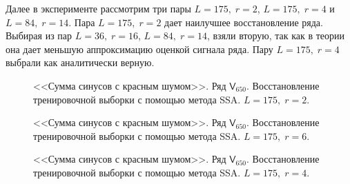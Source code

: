 \documentclass[specialist,
               substylefile = spbu.rtx,
               subf,href,colorlinks=true, 12p]{disser}
\begin{document}
Далее в эксперименте рассмотрим три пары $L = 175, \; r = 2$, $L = 175, \; r = 4$ и $L = 84, \; r = 14$. Пара $L = 175, \; r = 2$ дает наилучшее восстановление ряда. Выбирая из пар $L = 36, \; r = 16$, $L = 84, \; r = 14$, взяли вторую, так как в теории она дает меньшую аппроксимацию оценкой сигнала ряда. Пару $L = 175, \; r = 4$ выбрали как аналитически верную.

\begin{figure}[H]
	\captionsetup{justification=centering}
	\caption{<<Сумма синусов с красным шумом>>. Ряд $\mathsf{V}_{650}$. Восстановление тренировочной выборки с помощью метода SSA. $L = 175, \; r = 2$.}
	\label{ser_ssa_LH_r2}
\end{figure}

\begin{figure}[H]
	\captionsetup{justification=centering}
	\caption{<<Сумма синусов с красным шумом>>. Ряд $\mathsf{V}_{650}$. Восстановление тренировочной выборки с помощью метода SSA. $L = 175, \; r = 6$.}
	\label{ser_ssa_LH_r6}
\end{figure}

\begin{figure}[H]
	\captionsetup{justification=centering}
	\caption{<<Сумма синусов с красным шумом>>. Ряд $\mathsf{V}_{650}$. Восстановление тренировочной выборки с помощью метода SSA. $L = 175, \; r = 4$.}
	\label{ser_ssa_LH_r4}
\end{figure}
\end{document}
